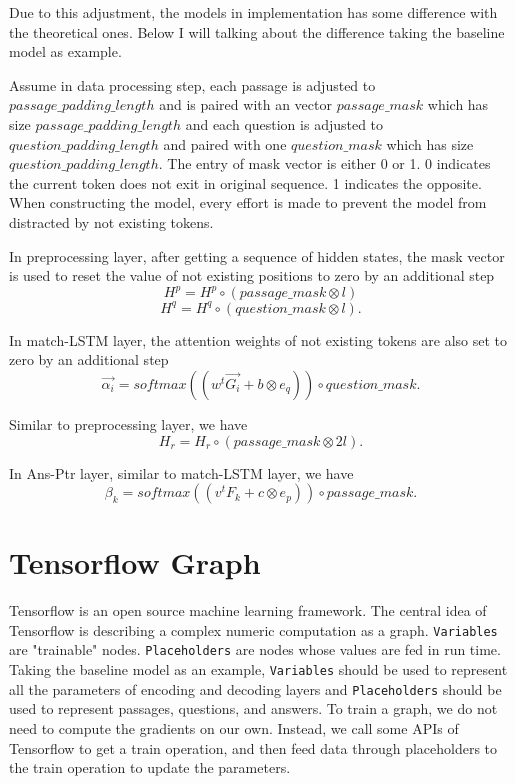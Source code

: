 \documentclass[modernstyle,12pt]{sjsuthesis}
\theoremstyle{definition}
\begin{document}
Due to this adjustment, the models in implementation has some difference with the theoretical ones. Below I will talking about the difference taking the baseline model as example.

Assume in data processing step, each passage is adjusted to $passage\_padding\_length$ and is paired with an vector $passage\_mask$ which has size $passage\_padding\_length$ and each question is adjusted to $question\_padding\_length$ and paired with one $question\_mask$ which has size $question\_padding\_length$. The entry of mask vector is either 0 or 1. 0 indicates the current token does not exit in original sequence. 1 indicates the opposite. When constructing the model, every effort is made to prevent the model from distracted by not existing tokens.

In preprocessing layer, after getting a sequence of hidden states, the mask vector is used to reset the value of not existing positions to zero by an additional step
$$H^p = H^p \circ (passage\_mask \otimes l)$$
$$H^q = H^q \circ (question\_mask \otimes l).$$

In match-LSTM layer, the attention weights of not existing tokens are also set to zero by an additional step
$$\overrightarrow{\alpha _i} = softmax( (w^t\overrightarrow{G_i} + b \otimes e_q) ) \circ question\_mask .$$

Similar to preprocessing layer, we have
$$H_r = H_r \circ (passage\_mask \otimes 2l).$$

In Ans-Ptr layer, similar to match-LSTM layer, we have
$$\beta _k = softmax( (v^tF_k + c \otimes e_p) ) \circ passage\_mask.$$


\section{Tensorflow Graph}

Tensorflow is an open source machine learning framework. The central idea of Tensorflow is describing a complex numeric computation as a graph.  {\tt Variables} are "trainable" nodes.  {\tt Placeholders} are nodes whose values are fed in run time. Taking the baseline model as an example,  {\tt Variables} should be used to represent all the parameters of encoding and decoding layers and {\tt Placeholders} should be used to represent passages, questions, and answers. To train a graph, we do not need to compute the gradients on our own. Instead, we call some APIs of Tensorflow to get a train operation, and then feed data through placeholders to the train operation to update the parameters.
\end{document}
